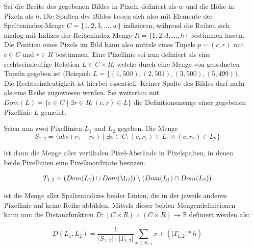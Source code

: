 Sei die Breite des gegebenen Bildes in Pixeln definiert als \(w\) und die Höhe in Pixeln als \(h\). Die Spalten des Bildes  lassen sich also mit Elemente der Spaltenindex-Menge \(C = \lbrace 1, 2, 3, \ldots , w \rbrace\) indizieren, während  die Reihen sich analog mit Indizes der Reihenindex-Menge \(R = \lbrace 1, 2, 3, \ldots , h \rbrace\) bestimmen lassen. Die Position eines Pixels im Bild kann also mittels eines Tupels \(p = (c, r)\) mit \(c \in C\) und \(r \in R\) bestimmen. Eine Pixellinie sei nun definiert als eine rechtseindeutige Relation \(L \in C \times R\), welche durch eine Menge von geordneten Tupeln gegeben ist (Beispiel: \(L = \lbrace (1, 500), (2,501), (3, 500), (5, 499) \rbrace\).
Die Rechtseindeutigkeit ist hierbei essentiell: Keiner Spalte des Bildes darf mehr als eine Reihe zugewiesen werden. Sei weiterhin mit \(Dom(L) = \lbrace c \in C \mid \exists r \in R: (c,r) \in L \rbrace\) die Definitionsmenge einer gegebenen Pixellinie \(L\) gemeint.\newline

Seien nun zwei Pixellinien \(L_{1}\) und \(L_{2}\) gegeben. Die Menge
\begin{equation}
S_{1,2} = \lbrace abs(r_{1} - r_{2}) \mid \exists c \in C: (c, r_{1}) \in L_{1} \wedge (c, r_{2}) \in L_{2} \rbrace
\end{equation}

ist dann die Menge aller vertikalen Pixel-Abstände in Pixelspalten, in denen beide Pixellinien eine Pixelkoordinate besitzen. 

\begin{equation}
T_{1,2} = (Dom(L_{1}) \cup Dom(\L_{2})) \setminus (Dom(L_{1}) \cap Dom(L_{2}))   
\end{equation}   

ist die Menge aller Spaltenindizes beider Linien, die in der jeweils anderen Pixellinie auf keine Reihe abbilden. Mittels dieser beiden Mengendefinitionen kann nun die Distanzfunktion \(D: (C \times R) \times (C \times R) \rightarrow \mathbb{R}\) definiert werden als:

\begin{equation}
D(L_{1}, L_{2}) = \frac{1}{\vert S_{1,2} \vert + \vert T_{1,2} \vert} \sum_{x \in S_{1, 2}}^{}x + ( \vert T_{1,2} \vert * h )
\end{equation}

